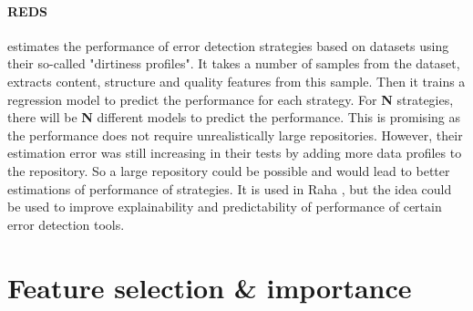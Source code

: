 \paragraph{REDS \cite{Mahdavi2019-pk}} estimates the performance of error detection strategies based on datasets using their so-called "dirtiness profiles". It takes a number of samples from the dataset, extracts content, structure and quality features from this sample. Then it trains a regression model to predict the performance for each strategy. For \textbf{N} strategies, there will be \textbf{N} different models to predict the performance.
This is promising as the performance does not require unrealistically large repositories. However, their estimation error was still increasing in their tests by adding more data profiles to the repository.
So a large repository could be possible and would lead to better estimations of performance of strategies.
It is used in Raha \cite{Mahdavi2019-zf}, but the idea could be used to improve explainability and predictability of performance of certain error detection tools.




\section{Feature selection \& importance}

